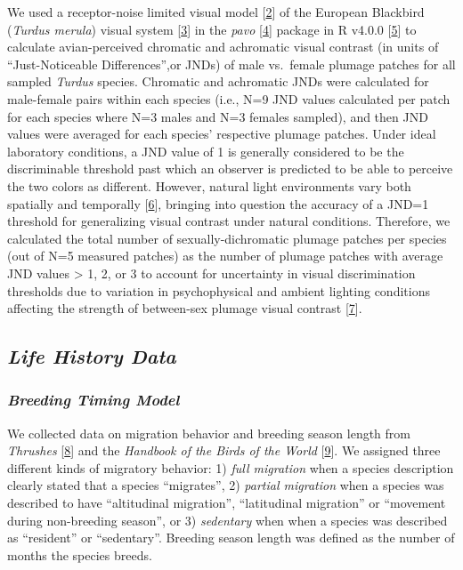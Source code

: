 We used a receptor-noise limited visual model
{[}\protect\hyperlink{ref-vorobyevReceptorNoiseDeterminant1998}{2}{]} of
the European Blackbird (\emph{Turdus merula}) visual system
{[}\protect\hyperlink{ref-hartVisualPigmentsOil2000}{3}{]} in the
\emph{pavo} {[}\protect\hyperlink{ref-maiaPavoNewTools2019}{4}{]}⁠
package in R v4.0.0
{[}\protect\hyperlink{ref-rcoreteamLanguageEnvironmentStatistical2020}{5}{]}⁠
to calculate avian-perceived chromatic and achromatic visual contrast
(in units of ``Just-Noticeable Differences'',or JNDs) of male vs.~female
plumage patches for all sampled \emph{Turdus} species. Chromatic and
achromatic JNDs were calculated for male-female pairs within each
species (i.e., N=9 JND values calculated per patch for each species
where N=3 males and N=3 females sampled), and then JND values were
averaged for each species' respective plumage patches. Under ideal
laboratory conditions, a JND value of 1 is generally considered to be
the discriminable threshold past which an observer is predicted to be
able to perceive the two colors as different. However, natural light
environments vary both spatially and temporally
{[}\protect\hyperlink{ref-endlerColorLightForests1993}{6}{]}⁠, bringing
into question the accuracy of a JND=1 threshold for generalizing visual
contrast under natural conditions. Therefore, we calculated the total
number of sexually-dichromatic plumage patches per species (out of N=5
measured patches) as the number of plumage patches with average JND
values \textgreater{} 1, 2, or 3 to account for uncertainty in visual
discrimination thresholds due to variation in psychophysical and ambient
lighting conditions affecting the strength of between-sex plumage visual
contrast
{[}\protect\hyperlink{ref-kempIntegrativeFrameworkAppraisal2015}{7}{]}⁠.

\hypertarget{life-history-data}{%
\subsection{\texorpdfstring{\emph{Life History
Data}}{Life History Data}}\label{life-history-data}}

\hypertarget{breeding-timing-model}{%
\subsubsection{\texorpdfstring{\emph{Breeding Timing
Model}}{Breeding Timing Model}}\label{breeding-timing-model}}

We collected data on migration behavior and breeding season length from
\emph{Thrushes} {[}\protect\hyperlink{ref-clementThrushes2000}{8}{]} and
the \emph{Handbook of the Birds of the World}
{[}\protect\hyperlink{ref-delhoyoHandbookBirdsWorld2017}{9}{]}⁠. We
assigned three different kinds of migratory behavior: 1) \emph{full
migration} when a species description clearly stated that a species
``migrates'', 2) \emph{partial migration} when a species was described
to have ``altitudinal migration'', ``latitudinal migration'' or
``movement during non-breeding season'', or 3) \emph{sedentary} when
when a species was described as ``resident'' or ``sedentary''. Breeding
season length was defined as the number of months the species breeds.

